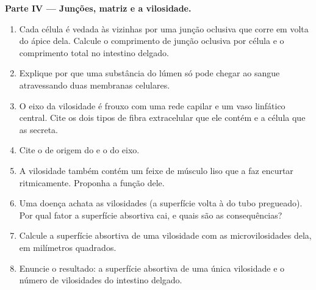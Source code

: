 \begin{problem}
\medskip
\noindent\textbf{Parte IV --- Junções, matriz e a vilosidade.}
\begin{enumerate}[resume]
  \item Cada célula é vedada às vizinhas por uma junção oclusiva que
        corre em volta do ápice dela. Calcule o comprimento de junção
        oclusiva por célula e o comprimento total no intestino delgado.
  \item Explique por que uma substância do lúmen só pode chegar ao
        sangue atravessando duas membranas celulares.
  \item O eixo da vilosidade é  frouxo com uma rede
        capilar e um vaso linfático central. Cite os dois tipos de fibra
        extracelular que ele contém e a célula que as secreta.
  \item Cite o  de origem do  e o do eixo.
  \item A vilosidade também contém um feixe de músculo liso que a faz
        encurtar ritmicamente. Proponha a função dele.
  \item Uma doença achata as vilosidades (a superfície volta à do tubo
        pregueado). Por qual fator a superfície absortiva cai, e quais
        são as consequências?
  \item Calcule a superfície absortiva de uma vilosidade com as
        microvilosidades dela, em milímetros quadrados.
  \item Enuncie o resultado: a superfície absortiva de uma única
        vilosidade e o número de vilosidades do intestino delgado.
\end{enumerate}
\end{problem}
